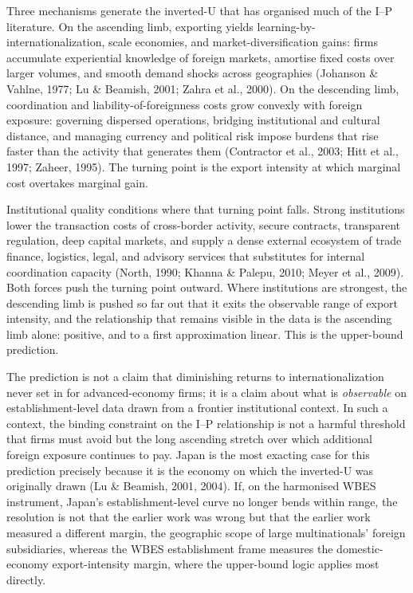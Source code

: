 \documentclass[
  12pt,a4paper]{article}
\begin{document}
Three mechanisms generate the inverted-U that has organised much of the
I--P literature. On the ascending limb, exporting yields
learning-by-internationalization, scale economies, and
market-diversification gains: firms accumulate experiential knowledge of
foreign markets, amortise fixed costs over larger volumes, and smooth
demand shocks across geographies (Johanson \& Vahlne, 1977; Lu \&
Beamish, 2001; Zahra et al., 2000). On the descending limb, coordination
and liability-of-foreignness costs grow convexly with foreign exposure:
governing dispersed operations, bridging institutional and cultural
distance, and managing currency and political risk impose burdens that
rise faster than the activity that generates them (Contractor et al.,
2003; Hitt et al., 1997; Zaheer, 1995). The turning point is the export
intensity at which marginal cost overtakes marginal gain.

Institutional quality conditions where that turning point falls. Strong
institutions lower the transaction costs of cross-border activity,
secure contracts, transparent regulation, deep capital markets, and
supply a dense external ecosystem of trade finance, logistics, legal,
and advisory services that substitutes for internal coordination
capacity (North, 1990; Khanna \& Palepu, 2010; Meyer et al., 2009). Both
forces push the turning point outward. Where institutions are strongest,
the descending limb is pushed so far out that it exits the observable
range of export intensity, and the relationship that remains visible in
the data is the ascending limb alone: positive, and to a first
approximation linear. This is the upper-bound prediction.

The prediction is not a claim that diminishing returns to
internationalization never set in for advanced-economy firms; it is a
claim about what is \emph{observable} on establishment-level data drawn
from a frontier institutional context. In such a context, the binding
constraint on the I--P relationship is not a harmful threshold that
firms must avoid but the long ascending stretch over which additional
foreign exposure continues to pay. Japan is the most exacting case for
this prediction precisely because it is the economy on which the
inverted-U was originally drawn (Lu \& Beamish, 2001, 2004). If, on the
harmonised WBES instrument, Japan's establishment-level curve no longer
bends within range, the resolution is not that the earlier work was
wrong but that the earlier work measured a different margin, the
geographic scope of large multinationals' foreign subsidiaries, whereas
the WBES establishment frame measures the domestic-economy
export-intensity margin, where the upper-bound logic applies most
directly.
\end{document}
